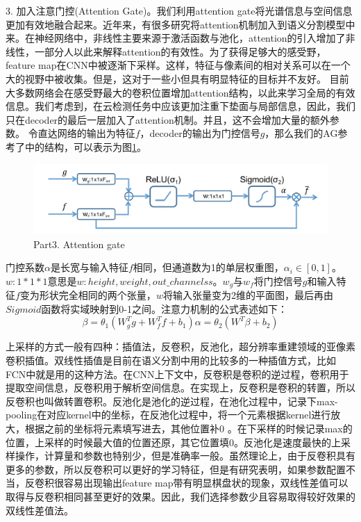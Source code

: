 \documentclass[UTF8]{ctexart}
\begin{document}
3. 加入注意门控(Attention Gate)。我们利用attention gate将光谱信息与空间信息更加有效地融合起来。近年来，有很多研究将attention机制加入到语义分割模型中来。在神经网络中，非线性主要来源于激活函数与池化，attention的引入增加了非线性，一部分人以此来解释attention的有效性。为了获得足够大的感受野，feature map在CNN中被逐渐下采样。这样，特征与像素间的相对关系可以在一个大的视野中被收集。但是，这对于一些小但具有明显特征的目标并不友好。
目前大多数网络会在感受野最大的卷积位置增加attention结构，以此来学习全局的有效信息。我们考虑到，在云检测任务中应该更加注重下垫面与局部信息，因此，我们只在decoder的最后一层加入了attention机制。并且，这不会增加大量的额外参数。
令直达网络的输出为特征$f$，decoder的输出为门控信号$g$，那么我们的AG参考了\cite{oktay2018attention}中的结构，可以表示为图\ref{pic:AG}。

\begin{figure}[H]
    \centering
    \includegraphics[scale=0.25]{../pic/AG.jpg}
    \caption[]{Part3. Attention gate}
    \label{pic:AG}
\end{figure}

门控系数$\alpha$是长宽与输入特征$f$相同，但通道数为1的单层权重图，$\alpha_i\in[0,1]$。$w:1*1*1$意思是$w:height,weight,out\_channelss$。$w_g$与$w_f$将门控信号$g$和输入特征$f$变为形状完全相同的两个张量，$w$将输入张量变为2维的平面图，最后再由$Sigmoid$函数将实域映射到0-1之间。注意力机制的公式表述如下：
\begin{equation}
    \beta = \theta_1(W_g^Tg+W_f^Tf+b_1)
    \alpha = \theta_2(W^T\beta+b_2)
\end{equation}

上采样的方式一般有四种：插值法，反卷积，反池化，超分辨率重建领域的亚像素卷积插值。双线性插值是目前在语义分割中用的比较多的一种插值方式，比如FCN中就是用的这种方法。在CNN上下文中，反卷积是卷积的逆过程，卷积用于提取空间信息，反卷积用于解析空间信息。在实现上，反卷积是卷积的转置，所以反卷积也叫做转置卷积。反池化是池化的逆过程，在池化过程中，记录下max-pooling在对应kernel中的坐标，在反池化过程中，将一个元素根据kernel进行放大，根据之前的坐标将元素填写进去，其他位置补0 。在下采样的时候记录max的位置，上采样的时候最大值的位置还原，其它位置填0。反池化是速度最快的上采样操作，计算量和参数也特别少，但是准确率一般。虽然理论上，由于反卷积具有更多的参数，所以反卷积可以更好的学习特征，但是有研究表明，如果参数配置不当，反卷积很容易出现输出feature map带有明显棋盘状的现象\cite{odena2016deconvolution}，双线性差值可以取得与反卷积相同甚至更好的效果。因此，我们选择参数少且容易取得较好效果的双线性差值法。
\end{document}
